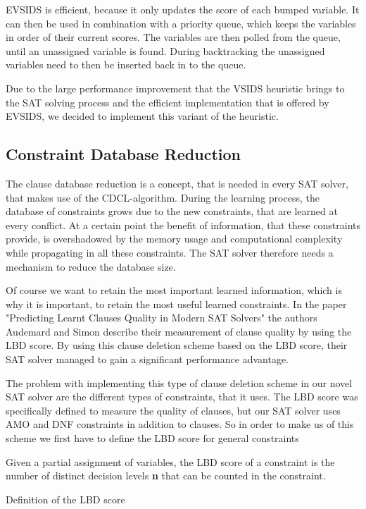 EVSIDS is efficient, because it only updates the score of each bumped variable. It can then be used in combination with a priority queue, which keeps the variables in order of their current scores. The variables are then polled from the queue, until an unassigned variable is found. During backtracking the unassigned variables need to then be inserted back in to the queue. \cite{biere2015evaluating}

Due to the large performance improvement that the VSIDS heuristic brings to the SAT solving process and the efficient implementation that is offered by EVSIDS, we decided to implement this variant of the heuristic.

\subsection{Constraint Database Reduction}

The clause database reduction is a concept, that is needed in every SAT solver, that makes use of the CDCL-algorithm. During the learning process, the database of constraints grows due to the new constraints, that are learned at every conflict. At a certain point the benefit of information, that these constraints provide, is overshadowed by the memory usage and computational complexity while propagating in all these constraints. The SAT solver therefore needs a mechanism to reduce the database size. \cite{biere2009handbook}

Of course we want to retain the most important learned information, which is why it is important, to retain the most useful learned constraints. In the paper "Predicting Learnt Clauses Quality in Modern SAT Solvers" \cite{audemard2009predicting} the authors Audemard and Simon describe their measurement of clause quality by using the LBD score. By using this clause deletion scheme based on the LBD score, their SAT solver managed to gain a significant performance advantage.

The problem with implementing this type of clause deletion scheme in our novel SAT solver are the different types of constraints, that it uses. The LBD score was specifically defined to measure the quality of clauses, but our SAT solver uses AMO and DNF constraints in addition to clauses. So in order to make us of this scheme we first have to define the LBD score for general constraints

\begin{definition}[!htb]
\begin{leftbar}
Given a partial assignment of variables, the LBD score of a constraint is the number of distinct decision levels \textbf{n} that can be counted in the constraint.
\end{leftbar}
\caption{Definition of the LBD score}
\label{def:LBD}
\end{definition}

